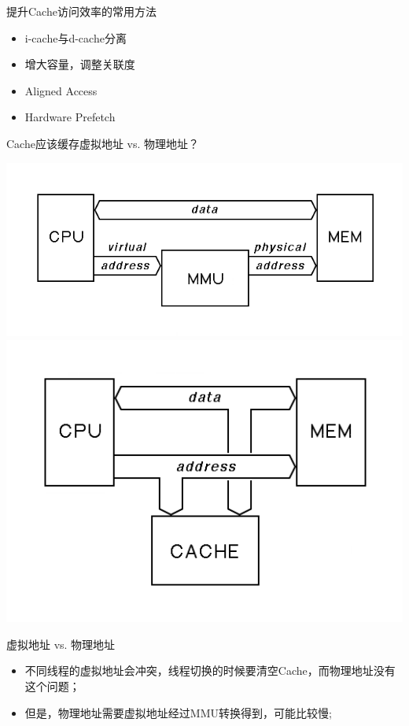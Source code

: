 \documentclass[handout]{beamer}
\begin{document}
\begin{CJK}{UTF8}{gbsn}
\begin{frame}{提升Cache访问效率的常用方法}
  \begin{itemize}
    \item {i-cache与d-cache分离}
    \item {增大容量，调整关联度}
    \item {Aligned Access}
    \item {Hardware Prefetch}
  \end{itemize}
\end{frame}

\begin{frame}{Cache应该缓存虚拟地址 vs. 物理地址？}
  \begin{block}{}
    \begin{center}
      \includegraphics[scale=0.2]{./images/cpu-mmu}
      \includegraphics[scale=0.2]{./images/cpu-cache-memory}
    \end{center}
    \pause
  \end{block}
  \begin{block}{虚拟地址 vs. 物理地址}
    \begin{itemize}
      \item {不同线程的虚拟地址会冲突，线程切换的时候要清空Cache，而物理地址没有这个问题； \pause}
      \item {但是，物理地址需要虚拟地址经过MMU转换得到，可能比较慢; \pause}
    \end{itemize}
  \end{block}
\end{frame}


\end{CJK}
\end{document}
